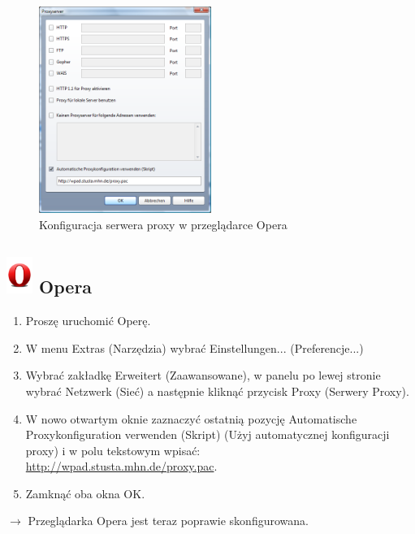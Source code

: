 \documentclass[a4paper,12pt]{scrartcl}
\begin{document}
\newpage
\begin{figure}
  \begin{center}
    \includegraphics[width=0.5\textwidth,keepaspectratio]{Bilder/Proxy_Opera}
  \end{center}
  \caption{Konfiguracja serwera proxy w przeglądarce Opera}
\end{figure}

\subsection*{\includegraphics[height=1.2cm,keepaspectratio]{Bilder/Opera_O} Opera}
\begin{enumerate}
    \item Proszę uruchomić Operę.
    \item W menu Extras (Narzędzia) wybrać Einstellungen... (Preferencje...)
    \item Wybrać zakładkę Erweitert (Zaawansowane), w panelu po lewej stronie wybrać Netzwerk (Sieć) a następnie kliknąć przycisk Proxy (Serwery Proxy).
    \item W nowo otwartym oknie zaznaczyć ostatnią pozycję Automatische Proxykonfiguration verwenden (Skript) (Użyj automatycznej konfiguracji proxy) i w polu tekstowym wpisać:\\ \url{http://wpad.stusta.mhn.de/proxy.pac}.
    \item Zamknąć oba okna OK.
\end{enumerate}
$\rightarrow$ Przeglądarka Opera jest teraz poprawie skonfigurowana.
\end{document}
